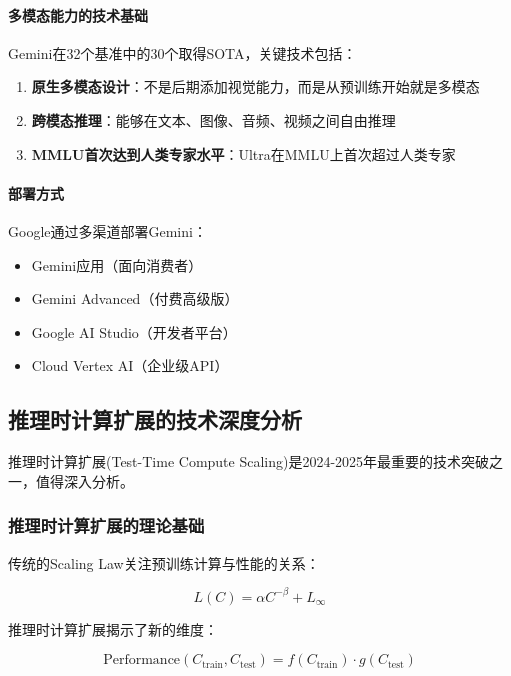 \documentclass[12pt,a4paper]{article}
\begin{document}
\paragraph{多模态能力的技术基础}

Gemini在32个基准中的30个取得SOTA，关键技术包括：

\begin{enumerate}
    \item \textbf{原生多模态设计}：不是后期添加视觉能力，而是从预训练开始就是多模态
    \item \textbf{跨模态推理}：能够在文本、图像、音频、视频之间自由推理
    \item \textbf{MMLU首次达到人类专家水平}：Ultra在MMLU上首次超过人类专家
\end{enumerate}

\paragraph{部署方式}

Google通过多渠道部署Gemini：
\begin{itemize}
    \item Gemini应用（面向消费者）
    \item Gemini Advanced（付费高级版）
    \item Google AI Studio（开发者平台）
    \item Cloud Vertex AI（企业级API）
\end{itemize}

\subsection{推理时计算扩展的技术深度分析}

推理时计算扩展(Test-Time Compute Scaling)是2024-2025年最重要的技术突破之一，值得深入分析。

\subsubsection{推理时计算扩展的理论基础}

传统的Scaling Law关注预训练计算与性能的关系：

\begin{equation}
L(C) = \alpha C^{-\beta} + L_\infty
\end{equation}

推理时计算扩展揭示了新的维度：

\begin{equation}
\text{Performance}(C_{\text{train}}, C_{\text{test}}) = f(C_{\text{train}}) \cdot g(C_{\text{test}})
\end{equation}
\end{document}
